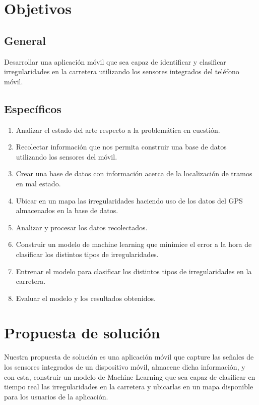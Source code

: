 \section*{Objetivos}
\subsection*{General}

Desarrollar una aplicación móvil que sea capaz de identificar y clasificar irregularidades en la carretera utilizando los sensores integrados del teléfono móvil.

\subsection*{Específicos}
\begin{enumerate}
		\item Analizar el estado del arte respecto a la problemática en cuestión.
		\item Recolectar información que nos permita construir una base de datos utilizando los sensores del móvil.
		\item Crear una base de datos con información acerca de la localización de tramos en mal estado. 
		\item Ubicar en un mapa las irregularidades haciendo uso de los datos del GPS almacenados en la base de datos.
		\item Analizar y procesar los datos recolectados. 
		\item Construir un modelo de machine learning que minimice el error a la hora de clasificar los distintos tipos de irregularidades. 
		\item Entrenar el modelo para clasificar los distintos tipos de irregularidades en la carretera.
		\item Evaluar el modelo y los resultados obtenidos.

\end{enumerate}

\section*{Propuesta de solución}

Nuestra propuesta de solución es una aplicación móvil que capture las señales de los sensores integrados de un dispositivo móvil, almacene dicha información, y con esta, construir un modelo de Machine Learning que sea capaz de clasificar en tiempo real las irregularidades en la carretera y ubicarlas en un mapa disponible para los usuarios de la aplicación.
